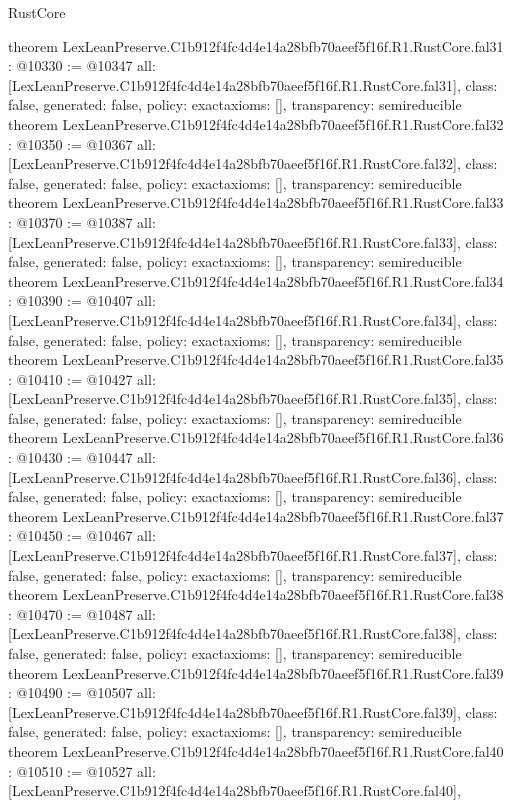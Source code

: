 \begin{lexlean}{RustCore}
\begin{coremodule}
{}
theorem LexLeanPreserve.C1b912f4fc4d4e14a28bfb70aeef5f16f.R1.RustCore.fal31 : @10330 := @10347 {
  all: [LexLeanPreserve.C1b912f4fc4d4e14a28bfb70aeef5f16f.R1.RustCore.fal31],
  class: false,
  generated: false,
  policy: exact{axioms: []},
  transparency: semireducible
}
theorem LexLeanPreserve.C1b912f4fc4d4e14a28bfb70aeef5f16f.R1.RustCore.fal32 : @10350 := @10367 {
  all: [LexLeanPreserve.C1b912f4fc4d4e14a28bfb70aeef5f16f.R1.RustCore.fal32],
  class: false,
  generated: false,
  policy: exact{axioms: []},
  transparency: semireducible
}
theorem LexLeanPreserve.C1b912f4fc4d4e14a28bfb70aeef5f16f.R1.RustCore.fal33 : @10370 := @10387 {
  all: [LexLeanPreserve.C1b912f4fc4d4e14a28bfb70aeef5f16f.R1.RustCore.fal33],
  class: false,
  generated: false,
  policy: exact{axioms: []},
  transparency: semireducible
}
theorem LexLeanPreserve.C1b912f4fc4d4e14a28bfb70aeef5f16f.R1.RustCore.fal34 : @10390 := @10407 {
  all: [LexLeanPreserve.C1b912f4fc4d4e14a28bfb70aeef5f16f.R1.RustCore.fal34],
  class: false,
  generated: false,
  policy: exact{axioms: []},
  transparency: semireducible
}
theorem LexLeanPreserve.C1b912f4fc4d4e14a28bfb70aeef5f16f.R1.RustCore.fal35 : @10410 := @10427 {
  all: [LexLeanPreserve.C1b912f4fc4d4e14a28bfb70aeef5f16f.R1.RustCore.fal35],
  class: false,
  generated: false,
  policy: exact{axioms: []},
  transparency: semireducible
}
theorem LexLeanPreserve.C1b912f4fc4d4e14a28bfb70aeef5f16f.R1.RustCore.fal36 : @10430 := @10447 {
  all: [LexLeanPreserve.C1b912f4fc4d4e14a28bfb70aeef5f16f.R1.RustCore.fal36],
  class: false,
  generated: false,
  policy: exact{axioms: []},
  transparency: semireducible
}
theorem LexLeanPreserve.C1b912f4fc4d4e14a28bfb70aeef5f16f.R1.RustCore.fal37 : @10450 := @10467 {
  all: [LexLeanPreserve.C1b912f4fc4d4e14a28bfb70aeef5f16f.R1.RustCore.fal37],
  class: false,
  generated: false,
  policy: exact{axioms: []},
  transparency: semireducible
}
theorem LexLeanPreserve.C1b912f4fc4d4e14a28bfb70aeef5f16f.R1.RustCore.fal38 : @10470 := @10487 {
  all: [LexLeanPreserve.C1b912f4fc4d4e14a28bfb70aeef5f16f.R1.RustCore.fal38],
  class: false,
  generated: false,
  policy: exact{axioms: []},
  transparency: semireducible
}
theorem LexLeanPreserve.C1b912f4fc4d4e14a28bfb70aeef5f16f.R1.RustCore.fal39 : @10490 := @10507 {
  all: [LexLeanPreserve.C1b912f4fc4d4e14a28bfb70aeef5f16f.R1.RustCore.fal39],
  class: false,
  generated: false,
  policy: exact{axioms: []},
  transparency: semireducible
}
theorem LexLeanPreserve.C1b912f4fc4d4e14a28bfb70aeef5f16f.R1.RustCore.fal40 : @10510 := @10527 {
  all: [LexLeanPreserve.C1b912f4fc4d4e14a28bfb70aeef5f16f.R1.RustCore.fal40],
}
\end{coremodule}
\end{lexlean}
